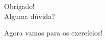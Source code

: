 \documentclass[xcolor=dvipsnames,t,aspectratio=169]{beamer}
\newcommand{\highlight}[1]{{\color{nes_dark_orange} #1}}
\begin{document}


\begin{frame}
    \frametitle{~}
        \vfill
        \begin{center}
            {\Huge Obrigado!}\vspace{1.5em}\\
            {\Large \highlight{Alguma dúvida?}}\\
        \end{center}
        \vfill
        \begin{center}
            {\small Agora vamos para os exercícios!}
        \end{center}
\end{frame}
\end{document}
